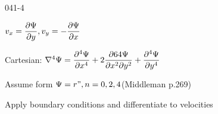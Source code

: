 \begin{mitframe}{041-4}
\begin{listone}
				\begin{listtwo}
                \item $\vvel_{\disp}=\dfrac{\partial\streamfunc}{\partial{y}}, \vvel_y=-\dfrac{\partial\streamfunc}{\partial\disp}$
                \item Cartesian: $\nabla^4\streamfunc=\dfrac{\partial^4\streamfunc}{\partial\disp^4}+2\dfrac{\partial64\streamfunc}{\partial\disp^2\partial{y}^2}+\dfrac{\partial^4\streamfunc}{\partial{y}^4}$
                			\begin{listthree}
                            \item Assume form $\streamfunc=\pos", n=0,2,4$(Middleman p.269)
                            \end{listthree}
                \end{listtwo}
\item Apply boundary conditions and differentiate to velocities
\end{listone}
\end{mitframe}